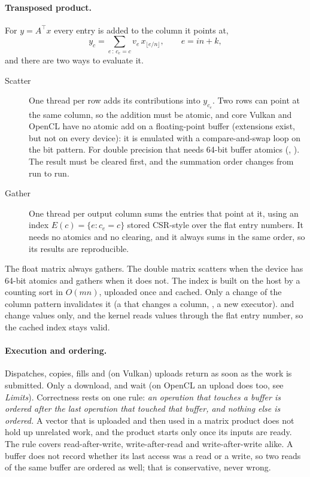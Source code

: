 \documentclass[main.tex]{subfiles}
\begin{document}
    \paragraph{Transposed product.}
    For $y = A^{\top}x$ every entry is added to the column it points at,
    \begin{equation}
        y_c = \sum_{e \,:\, c_e = c} v_e \, x_{\lfloor e/n \rfloor}, \qquad e = in+k ,
    \end{equation}
    and there are two ways to evaluate it.
    \begin{description}
        \item[Scatter] One thread per row adds its contributions into $y_{c_e}$. Two rows can point at the same column, so the addition must be atomic, and core Vulkan and OpenCL have no atomic add on a floating-point buffer (extensions exist, but not on every device): it is emulated with a compare-and-swap loop on the bit pattern. For double precision that needs 64-bit buffer atomics (, ). The result must be cleared first, and the summation order changes from run to run.
        \item[Gather] One thread per output column sums the entries that point at it, using an index $E(c)=\{e : c_e = c\}$ stored CSR-style over the flat entry numbers. It needs no atomics and no clearing, and it always sums in the same order, so its results are reproducible.
    \end{description}
    The float matrix always gathers. The double matrix scatters when the device has 64-bit atomics and gathers when it does not. The index is built on the host by a counting sort in $O(mn)$, uploaded once and cached. Only a change of the column pattern invalidates it (a  that changes a column, , a new executor).  and  change values only, and the kernel reads values through the flat entry number, so the cached index stays valid.

    \paragraph{Execution and ordering.}
    Dispatches, copies, fills and (on Vulkan) uploads return as soon as the work is submitted. Only a download,  and  wait (on OpenCL an upload does too, see \emph{Limits}). Correctness rests on one rule: \emph{an operation that touches a buffer is ordered after the last operation that touched that buffer, and nothing else is ordered.} A vector that is uploaded and then used in a matrix product does not hold up unrelated work, and the product starts only once its inputs are ready. The rule covers read-after-write, write-after-read and write-after-write alike. A buffer does not record whether its last access was a read or a write, so two reads of the same buffer are ordered as well; that is conservative, never wrong.
\end{document}
